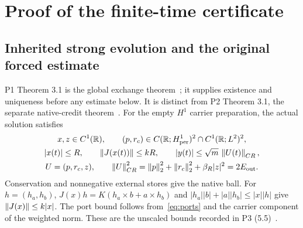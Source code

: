 \section{Proof of the finite-time certificate}\label{sec:proof}
\subsection{Inherited strong evolution and the original forced estimate}
P1 Theorem 3.1 is the global exchange theorem~\cite{p1}; it supplies existence and uniqueness before any estimate below. It is distinct from P2 Theorem 3.1, the separate native-credit theorem~\cite{p2}. For the empty $H^1$ carrier preparation, the actual solution satisfies
\begin{equation}\label{eq:regularity}%
\begin{gathered}
x,z\in C^1(\R),\qquad
(p,r_c)\in C(\R;H^1_{\rm per})^2\cap C^1(\R;L^2)^2,\\
|x(t)|\le R,\qquad \norm{J(x(t))}\le kR,\qquad
|y(t)|\le\sqrt m\,\norm{U(t)}_{CR},\\
U=(p,r_c,z),\qquad
\norm U_{CR}^2=\norm p_2^2+\norm{r_c}_2^2+\beta_R|z|^2
=2E_{\rm out}.
\end{gathered}
\end{equation}
Conservation and nonnegative external stores give the native ball. For $h=(h_a,h_b)$,
$J(x)h=K(h_a\times b+a\times h_b)$ and
$|h_a||b|+|a||h_b|\le |x||h|$ give $\left\|J(x)\right\|\le k|x|$.
The port bound follows from~\eqref{eq:ports} and the carrier component of the weighted norm. These are the unscaled bounds recorded in P3 (5.5)~\cite{p3}.

